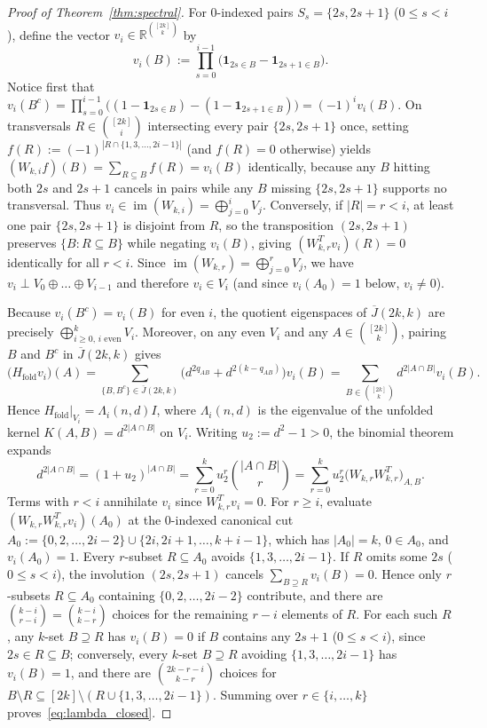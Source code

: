 \documentclass[11pt,reqno]{amsart}
\theoremstyle{definition}
\theoremstyle{remark}
\newcommand{\Jbar}{\overline{J}}
\begin{document}
\begin{proof}[Proof of Theorem~\ref{thm:spectral}]
For $0$-indexed pairs $S_s = \{2s, 2s+1\}$ ($0 \le s < i$), define the vector $v_i \in \mathbb{R}^{\binom{[2k]}{k}}$ by
\[
v_i(B) := \prod_{s=0}^{i-1} \bigl(\mathbf{1}_{2s \in B} - \mathbf{1}_{2s+1 \in B}\bigr).
\]
Notice first that $v_i(B^c) = \prod_{s=0}^{i-1}\bigl((1 - \mathbf{1}_{2s \in B}) - (1 - \mathbf{1}_{2s+1 \in B})\bigr) = (-1)^i v_i(B)$. On transversals $R \in \binom{[2k]}{i}$ intersecting every pair $\{2s, 2s+1\}$ once, setting $f(R) := (-1)^{|R \cap \{1,3,\dots,2i-1\}|}$ (and $f(R)=0$ otherwise) yields $(W_{k,i} f)(B) = \sum_{R \subseteq B} f(R) = v_i(B)$ identically, because any $B$ hitting both $2s$ and $2s+1$ cancels in pairs while any $B$ missing $\{2s, 2s+1\}$ supports no transversal. Thus $v_i \in \operatorname{im}(W_{k,i}) = \bigoplus_{j=0}^i V_j$. Conversely, if $|R| = r < i$, at least one pair $\{2s, 2s+1\}$ is disjoint from $R$, so the transposition $(2s, 2s+1)$ preserves $\{B : R \subseteq B\}$ while negating $v_i(B)$, giving $(W_{k,r}^T v_i)(R) = 0$ identically for all $r < i$. Since $\operatorname{im}(W_{k,r}) = \bigoplus_{j=0}^r V_j$, we have $v_i \perp V_0 \oplus \dots \oplus V_{i-1}$ and therefore $v_i \in V_i$ (and since $v_i(A_0) = 1$ below, $v_i \ne 0$).

Because $v_i(B^c) = v_i(B)$ for even $i$, the quotient eigenspaces of $\Jbar(2k,k)$ are precisely $\bigoplus_{i \ge 0,\, i\text{ even}}^k V_i$. Moreover, on any even $V_i$ and any $A \in \binom{[2k]}{k}$, pairing $B$ and $B^c$ in $\Jbar(2k,k)$ gives
\[
\bigl(H_{\mathrm{fold}} v_i\bigr)(A) = \sum_{\{B,B^c\} \in \Jbar(2k,k)} \bigl(d^{2q_{AB}} + d^{2(k-q_{AB})}\bigr) v_i(B) = \sum_{B \in \binom{[2k]}{k}} d^{2|A\cap B|} v_i(B).
\]
Hence $H_{\mathrm{fold}}|_{V_i} = \Lambda_i(n,d) I$, where $\Lambda_i(n,d)$ is the eigenvalue of the unfolded kernel $K(A,B) = d^{2|A\cap B|}$ on $V_i$. Writing $u_2 := d^2 - 1 > 0$, the binomial theorem expands
\[
d^{2|A\cap B|} = (1 + u_2)^{|A\cap B|} = \sum_{r=0}^k u_2^r \binom{|A\cap B|}{r} = \sum_{r=0}^k u_2^r \bigl(W_{k,r} W_{k,r}^T\bigr)_{A,B}.
\]
Terms with $r < i$ annihilate $v_i$ since $W_{k,r}^T v_i = 0$. For $r \ge i$, evaluate $(W_{k,r}W_{k,r}^T v_i)(A_0)$ at the $0$-indexed canonical cut $A_0 := \{0,2,\dots,2i-2\} \cup \{2i,2i+1,\dots,k+i-1\}$, which has $|A_0| = k$, $0 \in A_0$, and $v_i(A_0) = 1$. Every $r$-subset $R \subseteq A_0$ avoids $\{1,3,\dots,2i-1\}$. If $R$ omits some $2s$ ($0 \le s < i$), the involution $(2s, 2s+1)$ cancels $\sum_{B \supseteq R} v_i(B) = 0$. Hence only $r$-subsets $R \subseteq A_0$ containing $\{0,2,\dots,2i-2\}$ contribute, and there are $\binom{k-i}{r-i} = \binom{k-i}{k-r}$ choices for the remaining $r-i$ elements of $R$. For each such $R$, any $k$-set $B \supseteq R$ has $v_i(B) = 0$ if $B$ contains any $2s+1$ ($0 \le s < i$), since $2s \in R \subseteq B$; conversely, every $k$-set $B \supseteq R$ avoiding $\{1,3,\dots,2i-1\}$ has $v_i(B) = 1$, and there are $\binom{2k-r-i}{k-r}$ choices for $B \setminus R \subseteq [2k] \setminus (R \cup \{1,3,\dots,2i-1\})$. Summing over $r \in \{i,\dots,k\}$ proves~\eqref{eq:lambda_closed}.


\end{proof}
\end{document}
